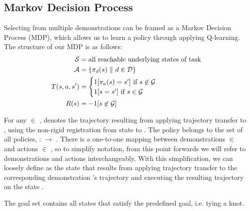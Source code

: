 \subsection{Markov Decision Process}
Selecting from multiple demonstrations can be framed as a Markov Decision
Process (MDP), which allows us to learn a policy through applying Q-learning. The structure of our MDP is as follows:
\begin{align*}
\mathcal{S}{} &=  \text{all reachable underlying states of task} \\
\mathcal{A}{} &= \{\pi_{d{}}({s}{})\ \| \text{ } d{} \in \mathcal{D}{}\} \\
T{}({s}{}, a{}, {s'}{}) &=
    \begin{cases}
    1[\pi_{a{}}({s}{}) = {s'}{}] \text{ if } {s}{} \not \in \mathcal{G}{} \\
    1[{s}{} = {s}{}'] \text{ if } {s}{} \in \mathcal{G}{}
    \end{cases}\\
R({s}{}) &= -1 {[ {s}{} \not \in \mathcal{G}{} ]} \\
\end{align*}

For any \demovar{} $\in$ \demoset{},  denotes the trajectory
resulting from applying trajectory transfer to , using
the non-rigid registration from state  to \statevar{}.
The policy  belongs to the set of all policies, \policyset{} : \transitionfn{}  \stateset{} $\rightarrow$
\stateset{}. There is a one-to-one mapping between demonstrations \demovar{}
$\in$ \demoset{} and actions \actionvar{} $\in$ \actionset{}, so to simplify
notation, from this point forwards we will refer to demonstrations and
actions interchangeably.
With this simplification, we can loosely define  as the
state that results from applying trajectory transfer to the corresponding
demonstration 's trajectory and executing the resulting trajectory
on the state \statevar{}.

The goal set \goalset{} contains all states that satisfy the
predefined goal, i.e. tying a knot.


